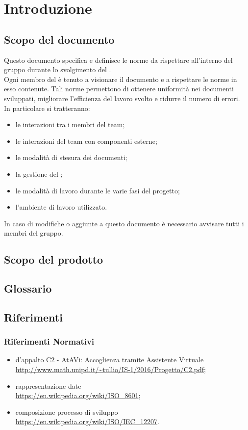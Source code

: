 \section{Introduzione}
	\subsection{Scopo del documento}
	Questo documento specifica e definisce le norme da rispettare all'interno del gruppo \GRUPPO{} durante lo svolgimento del  \PROGETTO. \\
	Ogni membro del  è tenuto a visionare il documento e a rispettare le norme in esso contenute. Tali norme permettono di ottenere uniformità nei documenti sviluppati,
	migliorare l'efficienza del lavoro svolto e ridurre il numero di errori. \\
	In particolare si tratteranno:
	\begin{itemize}
		\item le interazioni tra i membri del team;
		\item le interazioni del team con componenti esterne;
		\item le modalità di stesura dei documenti;
		\item la gestione del ;
		\item le modalità di lavoro durante le varie fasi del progetto;
		\item l'ambiente di lavoro utilizzato.
	\end{itemize}
	In caso di modifiche o aggiunte a questo documento è necessario avvisare tutti i membri del gruppo.
	\subsection{Scopo del prodotto}
		\SCOPO
	\subsection{Glossario}
		\GLOSSARIO
	\subsection{Riferimenti}
		\subsubsection{Riferimenti Normativi}
		\begin{itemize}
		\item {} d'appalto C2 - AtAVi: Accoglienza tramite Assistente Virtuale \\
		\url{http://www.math.unipd.it/~tullio/IS-1/2016/Progetto/C2.pdf};
		\item rappresentazione date \\
		\url{https://en.wikipedia.org/wiki/ISO_8601};
		\item composizione processo di sviluppo \\
		\url{https://en.wikipedia.org/wiki/ISO/IEC_12207}.
\newpage
	\end{itemize}
